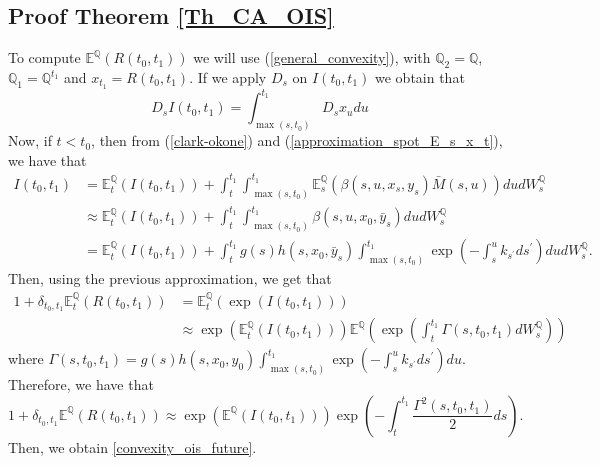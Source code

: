 \documentclass[a4paper,10pt]{article}
\newcommand{\1}{\mathbf{1}}
\begin{document}
\subsection{Proof Theorem \ref{Th_CA_OIS}}\label{Proof_CA_OIS_futures}
To compute $\mathbb{E}^{\mathbb{Q}}\left(R(t_0,t_1)\right)$ we will use (\ref{general_convexity}), with $\mathbb{Q}_2 = \mathbb{Q}$, $\mathbb{Q}_1 = \mathbb{Q}^{t_1}$ and $x_{t_1}=R(t_0,t_1)$. If we apply $D_s$ on $I(t_0,t_1)$ we obtain that
\begin{equation*}
D_s I(t_0,t_1) = \int_{\max(s, t_{0})}^{t_1}  D_s x_u du 
\end{equation*}
Now, if $t < t_0$, then from (\ref{clark-okone}) and (\ref{approximation_spot_E_s_x_t}), we have that 
\begin{align}\label{apprx_I_t0_t1}
I(t_0,t_1) &= \mathbb{E}_t^{\mathbb{Q}}\left(I(t_0,t_1)\right) + \int_{t}^{t_1}\int_{\max(s, t_{0})}^{t_1}  \mathbb{E}_s^{\mathbb{Q}}\left(\beta(s,u,x_s,y_s) \bar{M}(s,u) \right) du dW_s^{\mathbb{Q}} \nonumber \\
&\approx \mathbb{E}_t^{\mathbb{Q}}\left(I(t_0,t_1)\right) + \int_{t}^{t_1}\int_{\max(s, t_{0})}^{t_1} \beta(s,u,x_0,\bar{y}_s) du dW_s^{\mathbb{Q}}\nonumber \\
&= \mathbb{E}_t^{\mathbb{Q}}\left(I(t_0,t_1)\right) + \int_{t}^{t_1} g(s)h(s,x_0,\bar{y}_s)\int_{\max(s, t_{0})}^{t_1} \exp\left( -\int_{s}^{u} k_{s^{\prime}} ds^{\prime}\right) du dW_s^{\mathbb{Q}}.
\end{align}
Then, using the previous approximation, we get that
\begin{align*}
1 + \delta_{t_0,t_1}\mathbb{E}_t^{\mathbb{Q}}\left(R(t_0,t_1)\right) &= \mathbb{E}_t^{\mathbb{Q}}\left( \exp(I(t_0,t_1)) \right)\\
&\approx \exp\left(\mathbb{E}_t^{\mathbb{Q}}\left(I(t_0,t_1)\right)\right)  \mathbb{E}^{\mathbb{Q}}\left(\exp\left(\int_{t}^{t_1} \Gamma(s,t_0,t_1)dW_s^{\mathbb{Q}}\right)\right)
\end{align*}
where $\Gamma(s,t_0,t_1)= g(s)h(s,x_0,y_0)\int_{\max(s, t_{0})}^{t_1} \exp\left( -\int_{s}^{u} k_{s^{\prime}} ds^{\prime}\right)du$.\\
Therefore, we have that
\begin{equation}\label{representation_i_0_t}
1 + \delta_{t_0,t_1}\mathbb{E}^{\mathbb{Q}}\left(R(t_0,t_1)\right) \approx \exp\left(\mathbb{E}^{\mathbb{Q}}\left(I(t_0,t_1)\right)\right)\exp\left(-\int_{t}^{t_1}\frac{\Gamma^{2}(s,t_0,t_1)}{2} ds\right).
\end{equation}
Then, we obtain \eqref{convexity_ois_future}.
\end{document}
